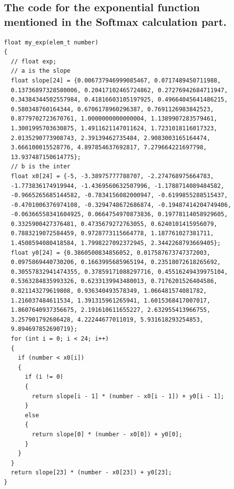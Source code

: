 \documentclass[default,iicol]{sn-jnl}%
\theoremstyle{thmstyleone}%
\theoremstyle{thmstyletwo}%
\theoremstyle{thmstylethree}%
\begin{document}
\begin{appendices}
\begin{lstlisting}
\end{lstlisting}

\subsection{The code for the exponential function mentioned in the Softmax calculation part.}\label{secA2}
\begin{lstlisting}
float my_exp(elem_t number)
{
  // float exp;
  // a is the slope
  float slope[24] = {0.006737946999085467, 0.0717489450711988, 
  0.13736897328580006, 0.20417102465724862, 0.27276942684711947,
  0.34384344502557984, 0.41816603105197925, 0.49664045641486215, 
  0.580348760164344, 0.6706178960296387, 0.7691126983842523, 
  0.8779702723670761, 1.0000000000000004, 1.1389907283579461, 
  1.3001995703630875, 1.4911621147011624, 1.7231018116017323, 
  2.0135290773908743, 2.39139462735484, 2.9083003165164474, 
  3.666100015528776, 4.897854637692817, 7.279664221697798, 
  13.937487150614775};
  // b is the inter
  float x0[24] = {-5, -3.38975777788707, -2.274768975664783, 
  -1.773836174919944, -1.4369560632507996, -1.1788714089484582, 
  -0.9665265685144582, -0.7834156082000947, -0.6199855288515437, 
  -0.4701006376974108, -0.3294748672686874, -0.19487414204749406, 
  -0.06366558341604925, 0.0664754970873836, 0.19778114058929605, 
  0.3325900427376481, 0.4735679272763055, 0.6240101415956079, 
  0.7883219072584459, 0.9728773115664778, 1.187761027381711, 
  1.4508594080418584, 1.7998227092372945, 2.3442268793669405};
  float y0[24] = {0.3860500834856052, 0.017587673747372003, 
  0.0975869440730206, 0.1663995685965194, 0.23518072618265692, 
  0.30557832941474355, 0.37859171088297716, 0.45516249439975104, 
  0.5363284835993326, 0.6233139943480013, 0.7176201526404586, 
  0.821143279619808, 0.936340493578349, 1.066481574081782, 
  1.216037484611534, 1.391315961265941, 1.6015368417007017, 
  1.8607640937356675, 2.191610611655227, 2.632955413966755,
  3.257901792686428, 4.22244677011019, 5.931618293254853, 
  9.894697852690719};
  for (int i = 0; i < 24; i++)
  {
    if (number < x0[i])
    {
      if (i != 0)
      {
        return slope[i - 1] * (number - x0[i - 1]) + y0[i - 1];
      }
      else
      {
        return slope[0] * (number - x0[0]) + y0[0];
      }
    }
  }
  return slope[23] * (number - x0[23]) + y0[23];
}


\end{lstlisting}



\end{appendices}
\end{document}

